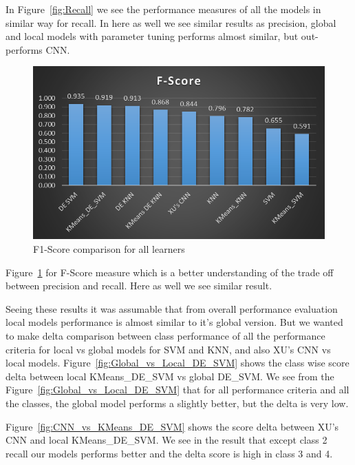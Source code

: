 \documentclass[sigconf]{acmart}
\theoremstyle{break}
\begin{document}
    In Figure~\ref{fig:Recall} we see the performance measures of all the models in similar way for recall. In here as well we see similar results as precision, global and local models with parameter tuning performs almost similar, but out-performs CNN.
    
    \begin{figure}
        \centering
        \includegraphics[width=\linewidth]{fig/f-score.png}
        \caption{F1-Score comparison for all learners}
        \label{fig:F1-Score}
    \end{figure}
    
    Figure~\ref{fig:F1-Score} for F-Score measure which is a better understanding of the trade off between precision and recall. Here as well we see similar result.
    
    Seeing these results it was assumable that from overall performance evaluation local models performance is almost similar to it's global version. But we wanted to make delta comparison between class performance of all the performance criteria for local vs global models for SVM and KNN, and also XU's CNN vs local models. Figure~\ref{fig:Global_vs_Local_DE_SVM} shows the class wise score delta between local KMeans\_DE\_SVM vs global DE\_SVM. We see from the Figure~\ref{fig:Global_vs_Local_DE_SVM} that for all performance criteria and all the classes, the global model performs a slightly better, but the delta is very low.
    
    Figure~\ref{fig:CNN_vs_KMeans_DE_SVM} shows the score delta between XU's CNN and local KMeans\_DE\_SVM. We see in the result that except class 2 recall our models performs better and the delta score is high in class 3 and 4.
\end{document}
